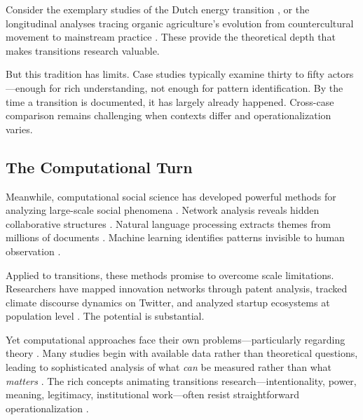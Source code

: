 \documentclass[../main.tex]{subfiles}
\begin{document}
Consider the exemplary studies of the Dutch energy transition \cite{verbong2007dutch}, or the longitudinal analyses tracing organic agriculture's evolution from countercultural movement to mainstream practice \cite{smith2006organic}. These provide the theoretical depth that makes transitions research valuable.

But this tradition has limits. Case studies typically examine thirty to fifty actors---enough for rich understanding, not enough for pattern identification. By the time a transition is documented, it has largely already happened. Cross-case comparison remains challenging when contexts differ and operationalization varies.

\subsection{The Computational Turn}

Meanwhile, computational social science has developed powerful methods for analyzing large-scale social phenomena \cite{lazer2009computational,salganik2019bitbybit,grimmer2021mlsocialscience}. Network analysis reveals hidden collaborative structures \cite{newman2010networks,borgatti2009network}. Natural language processing extracts themes from millions of documents \cite{grimmer2013text}. Machine learning identifies patterns invisible to human observation \cite{molina2019machine}.

Applied to transitions, these methods promise to overcome scale limitations. Researchers have mapped innovation networks through patent analysis, tracked climate discourse dynamics on Twitter, and analyzed startup ecosystems at population level \cite{jacobides2018ecosystems,phillips2019innovation}. The potential is substantial.

Yet computational approaches face their own problems---particularly regarding theory \cite{ruths2014social,boyd2012critical}. Many studies begin with available data rather than theoretical questions, leading to sophisticated analysis of what \emph{can} be measured rather than what \emph{matters} \cite{tufekci2014big}. The rich concepts animating transitions research---intentionality, power, meaning, legitimacy, institutional work---often resist straightforward operationalization \cite{lawrence2009institutional}.
\end{document}
